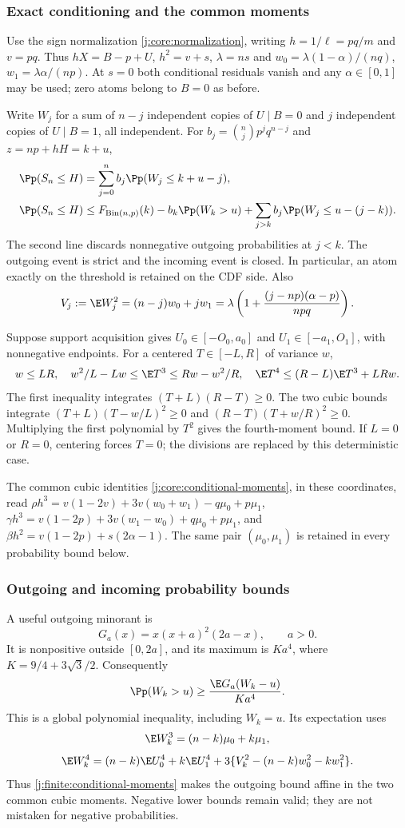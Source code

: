\subsubsection{Exact conditioning and the common moments}
Use the sign normalization \eqref{j:core:normalization}, writing
$h=1/\ell=pq/m$ and $v=pq$. Thus $hX=B-p+U$,
$h^2=v+s$, $\lambda=ns$ and
$w_0=\lambda(1-\alpha)/(nq)$, $w_1=\lambda\alpha/(np)$.
At $s=0$ both conditional residuals vanish and any $\alpha\in[0,1]$
may be used; zero atoms belong to $B=0$ as before.

Write $W_j$ for a sum of $n-j$ independent copies of $U\mid B=0$
and $j$ independent copies of $U\mid B=1$, all independent. For
$b_j=\binom njp^jq^{n-j}$ and $z=np+hH=k+u$,
\begin{align}
 \Pp(S_n\le H)&=\sum_{j=0}^n b_j\Pp(W_j\le k+u-j),
 \label{j:finite:count-identity}\\
 \Pp(S_n\le H)&\le F_{\mathrm{Bin}(n,p)}(k)
 -b_k\Pp(W_k>u)+\sum_{j>k}b_j\Pp(W_j\le u-(j-k)).
 \label{j:finite:count-bound}
\end{align}
The second line discards nonnegative outgoing probabilities at $j<k$.
The outgoing event is strict and the incoming event is closed. In particular,
an atom exactly on the threshold is retained on the CDF side.
Also
\[
 V_j:=\E W_j^2=(n-j)w_0+jw_1
 =\lambda\left(1+\frac{(j-np)(\alpha-p)}{npq}\right).
\]

Suppose support acquisition gives
$U_0\in[-O_0,a_0]$ and $U_1\in[-a_1,O_1]$, with nonnegative
endpoints. For a centered $T\in[-L,R]$ of variance $w$,
\begin{equation}\label{j:finite:conditional-moments}
 w\le LR,\quad w^2/L-Lw\le\E T^3\le Rw-w^2/R,
 \quad \E T^4\le(R-L)\E T^3+LRw.
\end{equation}
The first inequality integrates $(T+L)(R-T)\ge0$. The two cubic
bounds integrate $(T+L)(T-w/L)^2\ge0$ and
$(R-T)(T+w/R)^2\ge0$. Multiplying the first polynomial by $T^2$
gives the fourth-moment bound. If $L=0$ or $R=0$, centering forces
$T=0$; the divisions are replaced by this deterministic case.

The common cubic identities \eqref{j:core:conditional-moments}, in
these coordinates, read $\rho h^3=v(1-2v)+3v(w_0+w_1)-q\mu_0+p\mu_1$,
$\gamma h^3=v(1-2p)+3v(w_1-w_0)+q\mu_0+p\mu_1$, and
$\beta h^2=v(1-2p)+s(2\alpha-1)$. The same pair
$(\mu_0,\mu_1)$ is retained in every probability bound below.

\subsubsection{Outgoing and incoming probability bounds}
A useful outgoing minorant is
\[
 G_a(x)=x(x+a)^2(2a-x),\qquad a>0.
\]
It is nonpositive outside $[0,2a]$, and its maximum is
$K a^4$, where $K=9/4+3\sqrt3/2$. Consequently
\[
 \Pp(W_k>u)\ge \frac{\E G_a(W_k-u)}{K a^4}.
\]
This is a global polynomial inequality, including $W_k=u$.
Its expectation uses
\[
 \E W_k^3=(n-k)\mu_0+k\mu_1,
\]
\[
 \E W_k^4=(n-k)\E U_0^4+k\E U_1^4
 +3\{V_k^2-(n-k)w_0^2-kw_1^2\}.
\]
Thus \eqref{j:finite:conditional-moments} makes the outgoing bound affine in
the two common cubic moments. Negative lower bounds remain valid; they
are not mistaken for negative probabilities.

